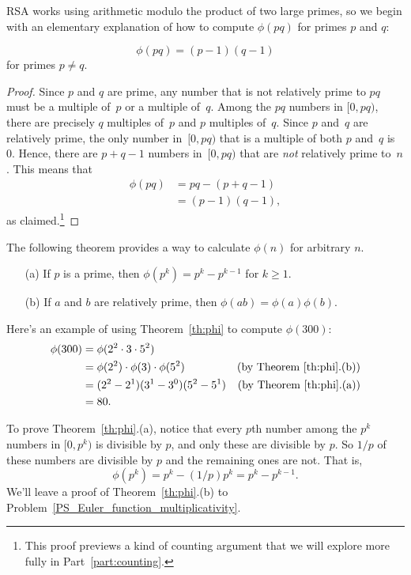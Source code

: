 RSA works using arithmetic modulo the product of two large primes, so we begin with an
elementary explanation of how to compute $\phi(pq)$ for primes $p$ and $q$:

\begin{lemma}\label{phi_pq}    %
\[
\phi(pq) = (p-1) (q-1)
\]
for primes $p\neq q$.
\end{lemma}

\begin{proof}
Since $p$ and $q$ are prime, any number that is not relatively prime to $pq$ must be a
multiple of~$p$ or a multiple of~$q$.  Among the $pq$ numbers in $[0, pq)$, there are
  precisely $q$ multiples of~$p$ and $p$ multiples of~$q$.  Since $p$ and~$q$ are
  relatively prime, the only number in~$[0, pq)$ that is a multiple of both $p$ and~$q$ is
    0.  Hence, there are $p + q - 1$ numbers in~$[0, pq)$ that are \emph{not} relatively
      prime to~$n$.  This means that
\begin{align*}
    \phi(pq) & = pq - (p + q - 1) \\ & = (p - 1) (q - 1),
\end{align*}
as claimed.\footnote{This proof previews a kind of counting argument that we will explore
  more fully in Part~\ref{part:counting}.}
\end{proof}

The following theorem provides a way to calculate $\phi(n)$ for arbitrary $n$.
\begin{theorem}\label{th:phi}\mbox{}
\begin{enumerate}
\item[(a)] If $p$ is a prime, then $\phi(p^k) = p^k - p^{k-1}$ for $k \geq 1$.
\item[(b)] If $a$ and $b$ are relatively prime, then $\phi(ab) = \phi(a)\phi(b)$.
\end{enumerate}
\end{theorem}

Here's an example of using Theorem~\ref{th:phi} to compute $\phi(300)$:
\begin{align*}
\phi(300) & = \phi(2^2 \cdot 3 \cdot 5^2)\\ & = \phi(2^2) \cdot \phi(3) \cdot \phi(5^2) &
\text{(by Theorem~\ref{th:phi}.(b))}\\ & = (2^2 - 2^1) (3^1 - 3^0) (5^2 - 5^1) & \text{(by
  Theorem~\ref{th:phi}.(a))}\\ & = 80.
\end{align*}

To prove Theorem~\ref{th:phi}.(a), notice that every $p$th number among the $p^k$ numbers
in $[0, p^{k})$ is divisible by $p$, and only these are divisible by $p$.  So $1/p$ of
  these numbers are divisible by $p$ and the remaining ones are not.  That is,
\[
\phi(p^{k}) = p^k - (1/p)p^k = p^k -p^{k-1}.
\]
We'll leave a proof of Theorem~\ref{th:phi}.(b) to
Problem~\ref{PS_Euler_function_multiplicativity}.

